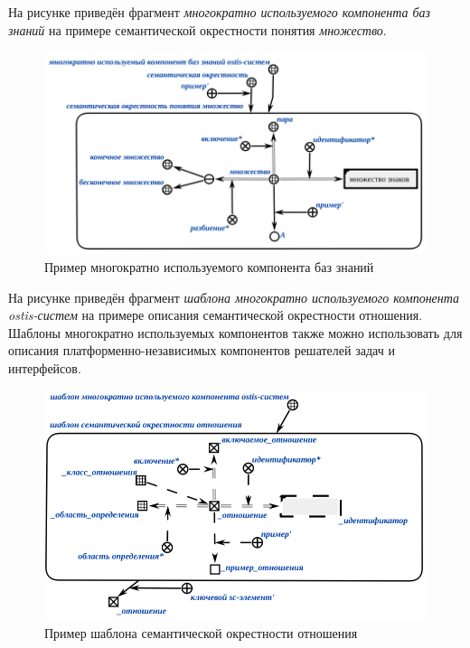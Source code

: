На рисунке \textit{} приведён фрагмент \textit{многократно используемого компонента баз знаний} на примере семантической окрестности понятия \textit{множество}.

\begin{figure}[H]
	\includegraphics[scale=0.6]{author/part5/figures/set_neighbourhood.png}
	\caption{Пример многократно используемого компонента баз знаний}
	\label{fig:set_neighbourhood}
\end{figure}

На рисунке \textit{} приведён фрагмент \textit{шаблона многократно используемого компонента ostis-систем} на примере описания семантической окрестности отношения. Шаблоны многократно используемых компонентов также можно использовать для описания платформенно-независимых компонентов решателей задач и интерфейсов.

\begin{figure}[H]
	\includegraphics[scale=0.6]{author/part5/figures/relation_template.png}
	\caption{Пример шаблона семантической окрестности отношения}
	\label{fig:relation_template}
\end{figure}

